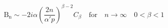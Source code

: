 \begin{equation}
\mathrm{B_n} \sim -2i\alpha \left( \frac{2n}{\alpha' p}\right) ^{\beta - 2} 
C_{\beta }\quad \mathrm{for}\quad n \rightarrow \infty \quad 0 < \beta < 1 
\end{equation}

